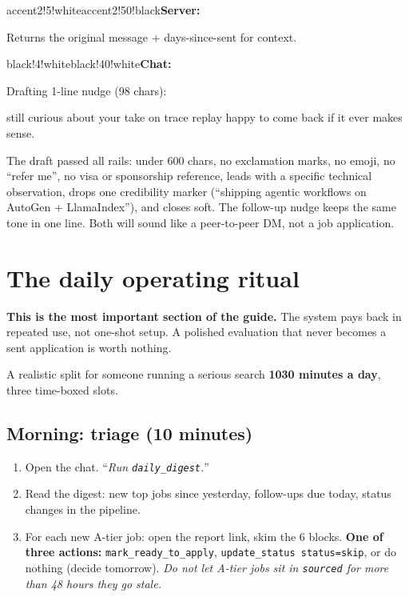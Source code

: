 \documentclass[11pt,letterpaper]{article}
\newcommand{\tool}[1]{\texttt{#1}}
\newenvironment{aiturn}{\begin{chatturn}{black!4!white}{black!40!white}\textbf{\sffamily\color{black!70}Chat:}\par\medskip}{\end{chatturn}}
\newenvironment{servturn}{\begin{chatturn}{accent2!5!white}{accent2!50!black}\textbf{\sffamily\color{accent2!60!black}Server:}\par\medskip}{\end{chatturn}}
\begin{document}
\begin{servturn}
Returns the original message + days-since-sent for context.
\end{servturn}

\begin{aiturn}
Drafting 1-line nudge (98 chars):

\medskip
\begin{tcolorbox}[colback=accent2!4!white, colframe=accent2!50!black, boxrule=0.4pt, arc=2pt, sharp corners=northwest]
\sffamily\small
still curious about your take on trace replay \textemdash{} happy to come back if it ever makes sense.
\end{tcolorbox}
\end{aiturn}

\medskip

\begin{examplebox}
The draft passed all rails: under 600 chars, no exclamation marks, no emoji, no ``refer me'', no visa or sponsorship reference, leads with a specific technical observation, drops one credibility marker (``shipping agentic workflows on AutoGen + LlamaIndex''), and closes soft. The follow-up nudge keeps the same tone in one line. Both will sound like a peer-to-peer DM, not a job application.
\end{examplebox}

\section{The daily operating ritual}\label{sec:ritual}

\begin{tipbox}
\textbf{This is the most important section of the guide.} The system pays back in repeated use, not one-shot setup. A polished evaluation that never becomes a sent application is worth nothing.
\end{tipbox}

A realistic split for someone running a serious search \textemdash{} \textbf{10\textendash{}30 minutes a day}, three time-boxed slots.

\subsection*{Morning: triage (10 minutes)}

\begin{enumerate}
\item Open the chat. ``\textit{Run \tool{daily\_digest}.}''
\item Read the digest: new top jobs since yesterday, follow-ups due today, status changes in the pipeline.
\item For each new A-tier job: open the report link, skim the 6 blocks. \textbf{One of three actions:} \tool{mark\_ready\_to\_apply}, \texttt{update\_status status=skip}, or do nothing (decide tomorrow). \emph{Do not let A-tier jobs sit in \texttt{sourced} for more than 48 hours \textemdash{} they go stale.}
\end{enumerate}
\end{document}
